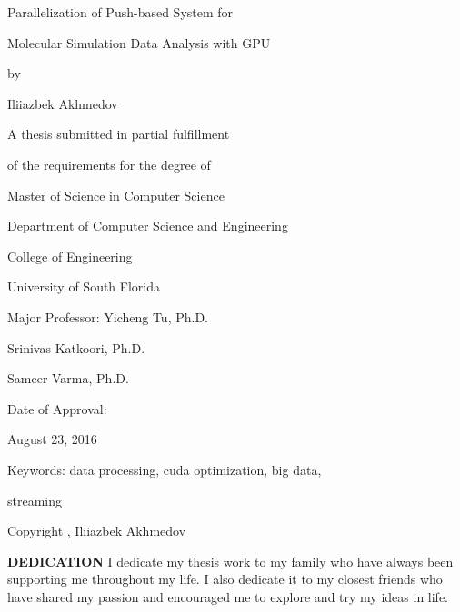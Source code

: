 \documentclass[12pt,letterpaper]{report}
\newcommand\frontmatter{%
    \cleardoublepage
  \pagenumbering{roman}}
\begin{document}
{
\frontmatter\thispagestyle{empty}\linespread{1}\selectfont\centering\vspace*{4\baselineskip}
Parallelization of Push-based System for 

\vspace*{1\baselineskip}

Molecular Simulation Data Analysis with GPU 
\vspace*{3\baselineskip}

{ by }

\vspace*{3\baselineskip}

{ Iliiazbek Akhmedov }

\vspace*{5\baselineskip}

A thesis submitted in partial fulfillment 

of the requirements for the degree of 

Master of Science in Computer Science 

Department of Computer Science and Engineering 

College of Engineering 

University of South Florida

\vspace*{3\baselineskip}
Major Professor:  Yicheng Tu, Ph.D.

Srinivas Katkoori, Ph.D.

Sameer Varma, Ph.D.

\vspace*{2\baselineskip}
Date of Approval:

August 23, 2016

\vspace*{3\baselineskip}
Keywords: data processing, cuda optimization, big data,

streaming

\vspace*{1\baselineskip}
Copyright \textcopyright{}, Iliiazbek Akhmedov

}

\linespread{1}\selectfont\clearpage
\thispagestyle{empty}
\centering
\linespread{1}\selectfont
\vspace*{3\baselineskip}
\textbf{DEDICATION}
\linespread{2}\selectfont
\justify
\hspace{3em} I dedicate my thesis work to my family who have always been supporting me throughout my life. I also dedicate it to my closest friends who have shared my passion and encouraged me to explore and try my ideas in life.
\end{document}
